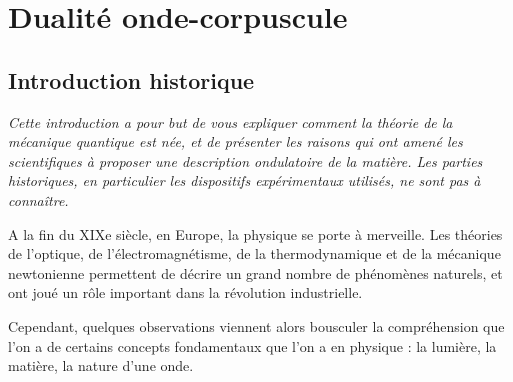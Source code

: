 \documentclass[11pt,fleqn]{book} %
\begin{document}










\setcounter{chapter}{10}

\chapter{Dualité onde-corpuscule}

\section{Introduction historique}

\textit{Cette introduction a pour but de vous expliquer comment la théorie de la mécanique quantique est née, et de présenter les raisons qui ont amené les scientifiques à proposer une description ondulatoire de la matière. Les parties historiques, en particulier les dispositifs expérimentaux utilisés, ne sont pas à connaître.}

A la fin du XIXe siècle, en Europe, la physique se porte à merveille. Les théories de l'optique, de l'électromagnétisme, de la thermodynamique et de la mécanique newtonienne permettent de décrire un grand nombre de phénomènes naturels, et ont joué un rôle important dans la révolution industrielle. 

Cependant, quelques observations viennent alors bousculer la compréhension que l'on a de certains concepts fondamentaux que l'on a en physique : la lumière, la matière, la nature d'une onde.
\end{document}
